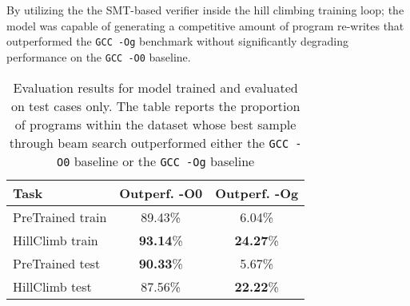 \documentclass{article}
\begin{document}
By utilizing the the SMT-based verifier inside the hill climbing training loop; the model was capable of generating a competitive amount of program re-writes that outperformed the \texttt{GCC -Og} benchmark without significantly  degrading performance on the \texttt{GCC -O0} baseline. 

\begin{table}[t]
\caption{Evaluation results for model trained and evaluated on test cases only. The table reports the proportion of programs within the dataset whose best sample through beam search outperformed either the \texttt{GCC -O0} baseline or the \texttt{GCC -Og} baseline}
\label{tab:random_generation_results}
\vskip 0.15in
\begin{center}
\begin{small}
\begin{sc}
\begin{tabular}{lcc}
\toprule
Task & Outperf. -O0 & Outperf. -Og \\
\midrule
PreTrained train   & 89.43\% & 6.04\% \\
HillClimb train  & \textbf{93.14}\% & \textbf{24.27}\% \\
\midrule
PreTrained test    & \textbf{90.33}\% & 5.67\% \\
HillClimb test  & 87.56\% & \textbf{22.22}\% \\
\bottomrule
\end{tabular}
\end{sc}
\end{small}
\end{center}
\vskip -0.1in
\end{table}
\end{document}
